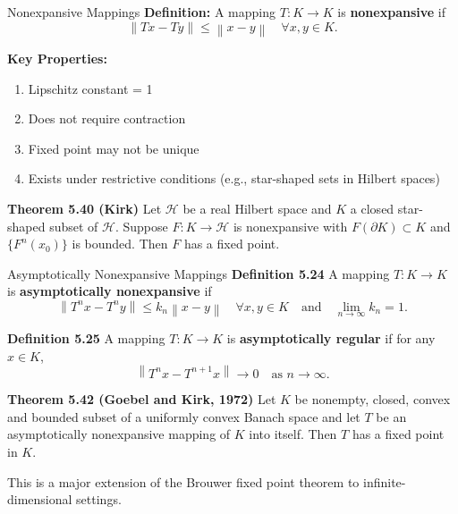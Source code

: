 \documentclass[aspectratio=169,10pt]{beamer}
\newcommand{\norm}[1]{\left\lVert#1\right\rVert}
\newcommand{\hilbert}{\mathcal{H}}
\begin{document}
\begin{frame}{Nonexpansive Mappings}
    \textbf{Definition:} A mapping $T: K \to K$ is \textbf{nonexpansive} if
    \[
        \norm{Tx - Ty} \leq \norm{x - y} \quad \forall x, y \in K.
    \]

    \vspace{0.4cm}
    \textbf{Key Properties:}
    \begin{enumerate}
        \item Lipschitz constant = 1
        \item Does not require contraction
        \item Fixed point may not be unique
        \item Exists under restrictive conditions (e.g., star-shaped sets in Hilbert spaces)
    \end{enumerate}

    \vspace{0.3cm}
    \textbf{Theorem 5.40 (Kirk)} Let $\hilbert$ be a real Hilbert space and $K$ a closed star-shaped subset of $\hilbert$. Suppose $F: K \to \hilbert$ is nonexpansive with $F(\partial K) \subset K$ and $\{F^n(x_0)\}$ is bounded. Then $F$ has a fixed point.
\end{frame}

\begin{frame}{Asymptotically Nonexpansive Mappings}
    \textbf{Definition 5.24} A mapping $T: K \to K$ is \textbf{asymptotically nonexpansive} if
    \[
        \norm{T^n x - T^n y} \leq k_n \norm{x - y} \quad \forall x, y \in K \quad \text{and} \quad \lim_{n\to\infty} k_n = 1.
    \]

    \vspace{0.3cm}
    \textbf{Definition 5.25} A mapping $T: K \to K$ is \textbf{asymptotically regular} if for any $x \in K$,
    \[
        \norm{T^n x - T^{n+1} x} \to 0 \quad \text{as } n \to \infty.
    \]

    \vspace{0.4cm}
    \textbf{Theorem 5.42 (Goebel and Kirk, 1972)} Let $K$ be nonempty, closed, convex and bounded subset of a uniformly convex Banach space and let $T$ be an asymptotically nonexpansive mapping of $K$ into itself. Then $T$ has a fixed point in $K$.

    \vspace{0.2cm}
    This is a major extension of the Brouwer fixed point theorem to infinite-dimensional settings.
\end{frame}
\end{document}
